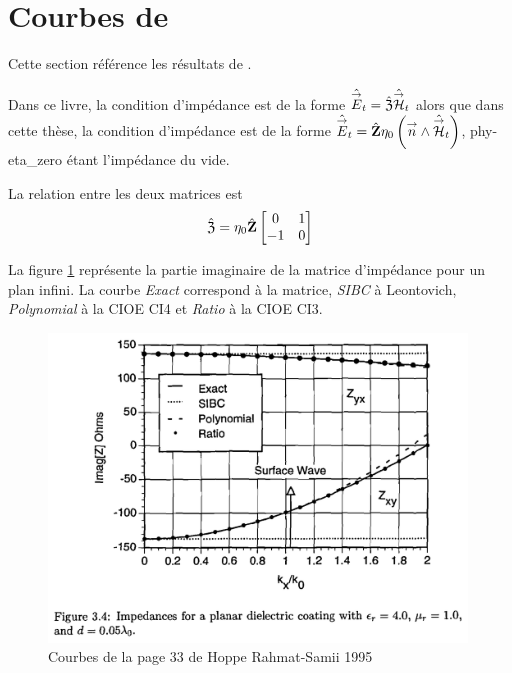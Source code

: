 \section{Courbes de \cite{hoppe_impedance_1995}}
\label{sec:annexe:hoppe}
Cette section référence les résultats de \cite{hoppe_impedance_1995}. 


Dans ce livre, la condition d'impédance est de la forme \(\hat{{\overset{\rightarrow}{E}}}_t = \hat{\mathfrak{Z}} \hat{{\overset{\rightarrow}{\mathcal{H}}}}_t\) alors que dans cette thèse, la condition d'impédance est de la forme \(\hat{{\overset{\rightarrow}{E}}}_t = \hat{\mathbf{Z}} \eta_0\left({\overset{\rightarrow}{n}} \wedge \hat{{\overset{\rightarrow}{\mathcal{H}}}}_t\right)\), \gls{phy-eta_zero} étant l'impédance du vide.

La relation entre les deux matrices est
\begin{equation}
  \hat{\mathfrak{Z}} = \eta_0\hat{\mathbf{Z}}\begin{bmatrix}0&1\\-1&0\end{bmatrix}
\end{equation}

La figure \ref{fig:annex:hoppe:p33} représente la partie imaginaire de la matrice d'impédance pour un plan infini. La courbe \textit{Exact} correspond à la matrice, \textit{SIBC} à Leontovich, \textit{Polynomial} à la CIOE CI4 et \textit{Ratio} à la CIOE CI3.

\begin{figure}[h!tb]
    \includegraphics[width=0.99\textwidth]{images/hoppe/p33_imp_cylindre.png}
    \caption{Courbes de la page 33 de Hoppe Rahmat-Samii 1995}
    \label{fig:annex:hoppe:p33}
\end{figure}

